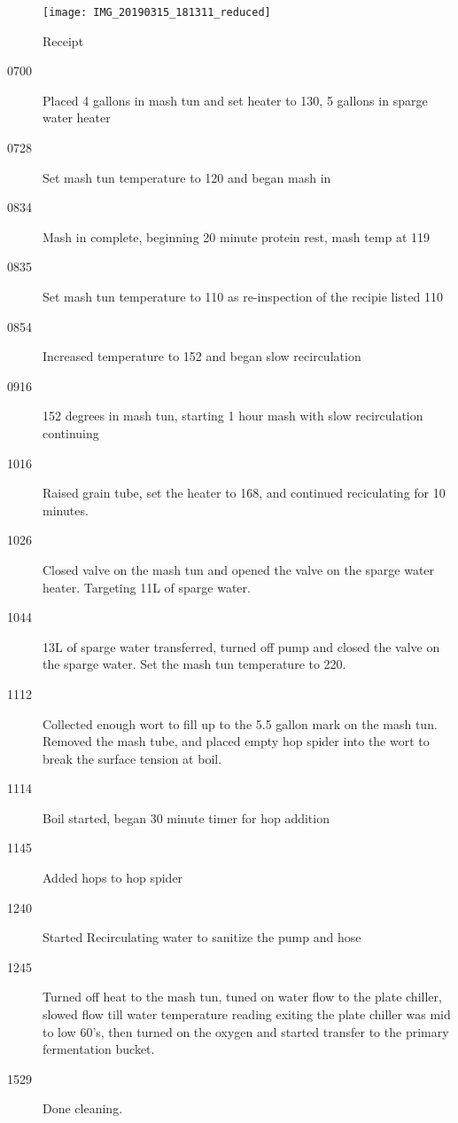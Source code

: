 \begin{figure}[H]
  \centering
  \texttt{[image: IMG\_20190315\_181311\_reduced]}
  \caption{Receipt}\label{fig:brew:receipt}
\end{figure}

\def\todaysdate{20190317}
\newday{\todaysdate}\label{\todaysdate}


\begin{description}
    \item[0700] Placed 4 gallons in mash tun and set heater to 130, 5 gallons in sparge water heater
    \item[0728] Set mash tun temperature to 120 and began mash in
    \item[0834] Mash in complete, beginning 20 minute protein rest, mash temp at 119
    \item[0835] Set mash tun temperature to 110 as re-inspection of the recipie listed 110
    \item[0854] Increased temperature to 152 and began slow recirculation
    \item[0916] 152 degrees in mash tun, starting 1 hour mash with slow recirculation continuing
    \item[1016] Raised grain tube, set the heater to 168, and continued reciculating for 10 minutes.
    \item[1026] Closed valve on the mash tun and opened the valve on the sparge water heater.  Targeting 11L of sparge water.
    \item[1044] 13L of sparge water transferred, turned off pump and closed the valve on the sparge water.  Set the mash tun temperature to 220.
    \item[1112] Collected enough wort to fill up to the 5.5 gallon mark on the mash tun.  Removed the mash tube, and placed empty hop spider into the wort to break the surface tension at boil.
    \item[1114] Boil started, began 30 minute timer for hop addition
    \item[1145] Added hops to hop spider
    \item[1240] Started Recirculating water to sanitize the pump and hose
    \item[1245] Turned off heat to the mash tun, tuned on water flow to the plate chiller, slowed flow till water temperature reading exiting the plate chiller was mid to low 60's, then turned on the oxygen and started transfer to the primary fermentation bucket.
    \item[1529] Done cleaning.
\end{description}

